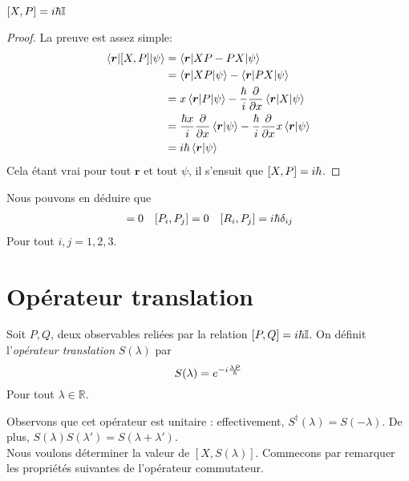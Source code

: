 \documentclass[../Notesdecours.tex]{subfiles}
\begin{document}
\begin{Property} $[X,P] = i\hbar\mathbb{I}$ \end{Property}
\begin{proof}
La preuve est assez simple:
\begin{align*}
	\braket{\bm{r}|[X,P]|\psi} &= \braket{\bm{r}|XP-PX|\psi}\\
	&= \braket{\bm{r}|XP|\psi} - \braket{\bm{r}|PX|\psi}\\
	&= x\braket{\bm{r}|P|\psi} -\frac{\hbar}{i}\frac{\partial}{\partial x}\braket{\bm{r}|X|\psi}\\
	&= \frac{\hbar x}{i}\frac{\partial}{\partial x}\braket{\bm{r}|\psi} - \frac{\hbar}{i} \frac{\partial}{\partial x}x\braket{\bm{r}|\psi}\\
	&= i\hbar \braket{\bm{r}|\psi}
\end{align*}
Cela étant vrai pour tout $\bm{r}$ et tout $\psi$, il s'ensuit que $[X,P] = i\hbar$.
\end{proof}
Nous pouvons en déduire que 
\begin{align}
[R_i,R_j] &= 0 & [P_i,P_j] &= 0 & [R_i,P_j] = i\h\delta_{ij}
\end{align}
Pour tout $i,j = 1,2,3$.

\section{Opérateur translation}
\begin{definition}
	Soit $P,Q$, deux observables reliées par la relation $[P,Q] = i\hbar\mathbb{I}$. On définit l'\emph{opérateur translation} $S(\lambda)$ par
	\begin{equation}
		S(\lambda) = e^{-i\frac{\lambda P}{\hbar}}
	\end{equation}
	Pour tout $\lambda\in\mathbb{R}$.
\end{definition}
Observons que cet opérateur est unitaire : effectivement, $S^\dagger (\lambda) = S(-\lambda)$. De plus, $S(\lambda)S(\lambda') = S(\lambda + \lambda')$.\\

Nous voulons déterminer la valeur de $[X,S(\lambda)]$. Commecons par remarquer les propriétés suivantes de l'opérateur commutateur.
\end{document}
